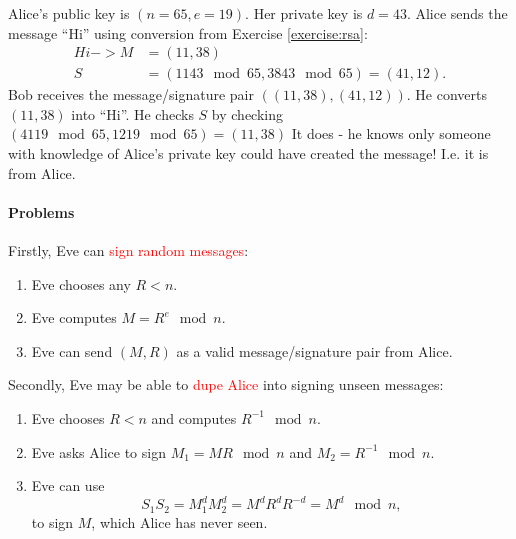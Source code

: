 \documentclass[a4paper, 11pt, openany]{book}
\numberwithin{equation}{section}
\theoremstyle{plain}
\theoremstyle{definition}
\newcommand{\Important}[1]{\textcolor{red}{#1}}
\begin{document}
Alice’s public key is $(n = 65,e = 19)$. Her private key is $d = 43$. Alice sends the message ``Hi'' using conversion from Exercise \ref{exercise:rsa}:
\begin{align*}
    Hi -> M &= (11, 38)\\
    S &= (1143 \mod 65, 3843 \mod 65) = (41 , 12).
\end{align*}
Bob receives the message/signature pair $((11,38),(41,12))$.
He converts $(11,38)$ into ``Hi''.
He checks $S$ by checking $(4119 \mod 65,1219 \mod 65) = (11,38)$
It does - he knows only someone with knowledge of Alice’s private key could have created the message! I.e. it is from Alice.



\paragraph{Problems}

Firstly, Eve can \Important{sign random messages}:
\begin{enumerate}
    \item Eve chooses any $R < n$.
    
    \item Eve computes $M = R^e \mod n$.
    
    \item Eve can send $(M,R)$ as a valid message/signature pair from Alice.
\end{enumerate}

Secondly, Eve may be able to \Important{dupe Alice} into signing unseen messages:
\begin{enumerate}
    \item Eve chooses $R < n$ and computes $R^{-1} \mod n$.
    
    \item Eve asks Alice to sign $M_1 = MR \mod n$ and $M_2 = R^{-1} \mod n$.
    
    \item Eve can use 
    \[
        S_1S_2 = M_1^d M_2^d = M^d R^d R^{-d} = M^d \mod n,
    \]
    to sign $M$, which Alice has never seen.
\end{enumerate}

\end{document}

